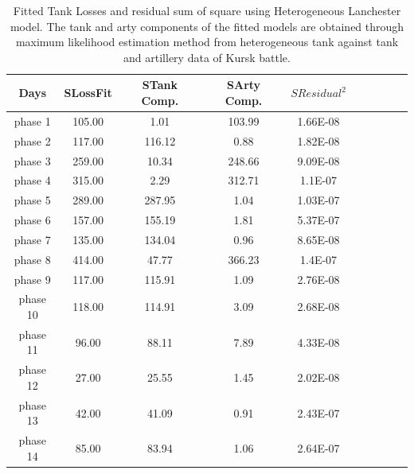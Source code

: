 \documentclass[]{article}
\begin{document}
\begin{table}
\tiny
\caption{Fitted Tank Losses and residual sum of square using Heterogeneous Lanchester model. The tank and arty components of the fitted models are obtained through maximum likelihood estimation method from heterogeneous tank against tank and artillery data of Kursk battle.}
{\begin{tabular}{|c|c|c|c|c|c|c|c|c|c|}   \hline\hline
Days & SLossFit	& STank Comp. &	SArty Comp.	& $SResidual^2$	 \\
\hline
\hline
phase 1&	105.00&	1.01&	103.99&	1.66E-08	\\\hline
phase 2	&117.00	&116.12&	0.88&	1.82E-08	\\\hline
phase 3	&259.00	&10.34&	248.66	&9.09E-08\\\hline
phase 4	&315.00	&2.29&312.71&	1.1E-07\\\hline
phase 5	&289.00	&287.95	&1.04	&1.03E-07\\\hline
phase 6	&157.00	&155.19	&1.81&	5.37E-07\\\hline
phase 7	&135.00	&134.04&	0.96	&8.65E-08	\\\hline
phase 8	&414.00	&47.77&	366.23	&1.4E-07\\\hline
phase 9	&117.00	&115.91&	1.09&	2.76E-08\\\hline
phase 10&	118.00&	114.91&	3.09&	2.68E-08\\\hline
phase 11&	96.00&	88.11	&7.89&	4.33E-08\\\hline
phase 12&	27.00&	25.55&	1.45&	2.02E-08\\\hline
phase 13&	42.00	&41.09	& 0.91&	2.43E-07\\\hline
phase 14&	85.00&	83.94&	1.06	&2.64E-07\\\hline

\hline

\end{tabular}}
\end{table}
\end{document}
